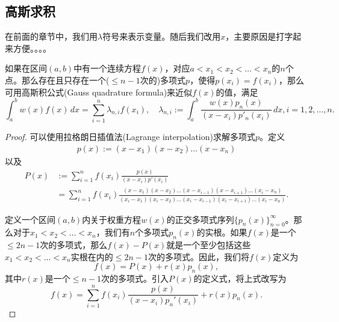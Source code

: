\begin{subappendices}
\subsection{高斯求积}
\label{sec:poly-gauss-quadrature}
在前面的章节中，我们用$\lambda$符号来表示变量。随后我们改用$x$，主要原因是打字起来方便。。。。

\begin{theorem}[高斯积公式]
  \label{theorem:poly-gauss-quadrature-def}
  如果在区间$(a,b)$中有一个连续方程$f(x)$，对应$a<x_1<x_2< \ldots < x_n$的$n$个点。那么存在且只存在一个($\le n-1$次的)多项式$p$，使得$p(x_i) = f(x_i)$，那么可用高斯积公式(Gauss quadrature formula)来近似$f(x)$的值，满足
  \begin{equation}
    \label{eq:poly-gauss-quadrature-def}
    \int_a^b w(x) f(x) \, dx = \sum_{i=1}^n \lambda_{n,i} f(x_i), \quad \lambda_{n,i}:= \int_a^b \frac{w(x) p_n(x)}{\left( x-x_i \right) p'_n(x_i)} \, dx, i=1,2,\ldots,n.
  \end{equation}
\end{theorem}
\begin{proof}
可以使用拉格朗日插值法(Lagrange interpolation)求解多项式$p$。定义
\begin{align*}
  p(x) := (x-x_1) (x-x_2) \ldots (x-x_n)
\end{align*}
以及
\begin{equation*}
  \begin{split}
      P(x) &:= \sum_{i=1}^{n} f(x_i) \frac{p(x)}{(x-x_i) p'(x_i)} \\
      &= \sum_{i=1}^{n} f(x_i) \frac{(x-x_1) (x-x_2) \ldots (x-x_{i-1}) (x-x_{i+1}) \ldots (x_i-x_{n})}{(x_i-x_1) (x_i-x_2) \ldots (x_i-x_{i-1}) (x_i-x_{i+1}) \ldots (x_i-x_{n})}.
  \end{split}
\end{equation*}

定义一个区间$(a,b)$内关于权重方程$w(x)$的正交多项式序列$\{ p_n(x) \}_{n=0}^{\infty}$。那么对于$x_1 < x_2 < \ldots < x_n$，我们有$n$个多项式$p_n(x)$的实根。如果$f(x)$是一个$\le 2n-1$次的多项式，那么$f(x) - P(x)$就是一个至少包括这些$x_1 < x_2 < \ldots < x_n$实根在内的$\le 2n-1$次的多项式。因此，我们将$f(x)$定义为
\begin{equation*}
  f(x) = P(x) + r(x) p_n(x),
\end{equation*}
其中$r(x)$是一个$\le n-1$次的多项式。引入$P(x)$的定义式，将上式改写为
\begin{equation*}
  f(x) = \sum_{i=1}^{n} f(x_i) \frac{p(x)}{(x-x_i) p_n'(x_i)} + r(x) p_n(x).
\end{equation*}


\end{proof}
\end{subappendices}
